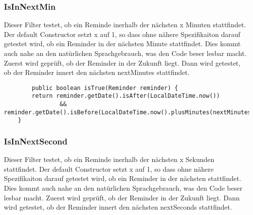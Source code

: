       \subsubsection{IsInNextMin}
      Dieser Filter testet, ob ein Reminde inerhalb der nächsten x Minuten stattfindet.
      Der default Constructor setzt x auf 1, so dass ohne nähere Spezifikaiton darauf getestet wird, ob ein Reminder in der nächsten Minute stattfindet.
      Dies kommt auch nahe an den natürlichen Sprachgebrauch, was den Code beser lesbar macht.
      Zuerst wird geprüft, ob der Reminder in der Zukunft liegt. Dann wird getestet, ob der Reminder innert den nächsten nextMinutes stattfindet.
      \begin{lstlisting}
        public boolean isTrue(Reminder reminder) {
        return reminder.getDate().isAfter(LocalDateTime.now())
                && reminder.getDate().isBefore(LocalDateTime.now().plusMinutes(nextMinutes));
    }
      \end{lstlisting}

      \subsubsection{IsInNextSecond}
      Dieser Filter testet, ob ein Reminde inerhalb der nächsten x Sekunden stattfindet.
      Der default Constructor setzt x auf 1, so dass ohne nähere Spezifikaiton darauf getestet wird, ob ein Reminder in der nächsten stattfindet.
      Dies kommt auch nahe an den natürlichen Sprachgebrauch, was den Code beser lesbar macht.
      Zuerst wird geprüft, ob der Reminder in der Zukunft liegt. Dann wird getestet, ob der Reminder innert den nächsten nextSeconds stattfindet.
      
 
